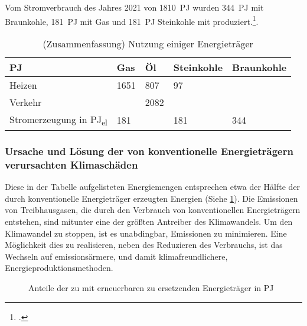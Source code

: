 \documentclass[12pt, ngerman]{article}
\begin{document}
Vom Stromverbrauch des Jahres 2021 von \qty{1810}{PJ} wurden \qty{344}{PJ} mit Braunkohle, \qty{181}{PJ} mit Gas
und \qty{181}{PJ} Steinkohle mit produziert.\footcite{SMARDEntwicklungenIm}.



\begin{table}[!htbp]
    \centering
    \begin{tabular}{l|llll}
        \toprule
        \unit{PJ}      & Gas  & Öl   & Steinkohle & Braunkohle \\
        \midrule
        Heizen         & 1651 & 807  & 97         &            \\
        Verkehr        &      & 2082 &            &            \\
        \midrule
        Stromerzeugung in \unit{PJ_{el}} & 181  &      & 181        & 344        \\

        \bottomrule
    \end{tabular}
    \caption{(Zusammenfassung) Nutzung einiger Energieträger}
\end{table}

\subsubsection{Ursache und Lösung der von konventionelle Energieträgern verursachten Klimaschäden}


Diese in der Tabelle aufgelisteten Energiemengen entsprechen etwa der Hälfte
der durch konventionelle Energieträger erzeugten Energien (Siehe \cref{fig:kon}).
Die Emissionen von Treibhausgasen, die durch den Verbrauch von konventionellen Energieträgern
entstehen, sind mitunter eine der größten Antreiber des Klimawandels.
Um den Klimawandel zu stoppen, ist es unabdingbar, Emissionen zu minimieren.
Eine Möglichkeit dies zu realisieren, neben des Reduzieren des Verbrauchs,
ist das Wechseln auf emissionsärmere, und damit klimafreundlichere,
Energieproduktionsmethoden.

\begin{figure}[!h]
    \caption{Anteile der zu mit erneuerbaren zu ersetzenden Energieträger in \unit{PJ}}
    \label{fig:kon}
\end{figure}
\end{document}
